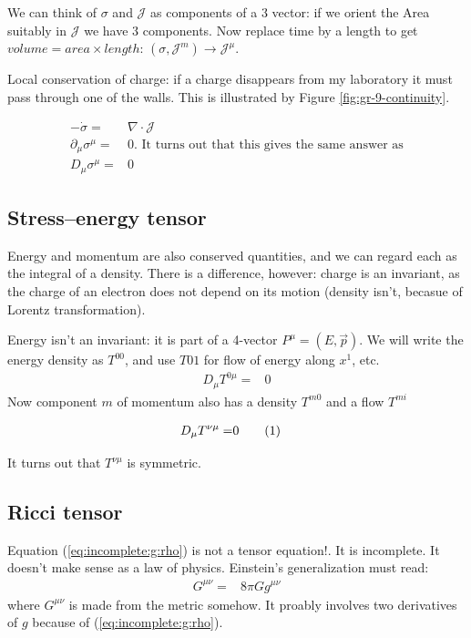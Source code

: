 \documentclass[]{article}
\newcommand\numberthis{\addtocounter{equation}{1}\tag{\theequation}}
\begin{document}
{We can think of $\sigma$ and $\mathscr{J}$ as components of a 3 vector: if we orient the Area suitably in $\mathscr{J}$ we have 3 components. Now replace time by a length to get $volume=area \times length$: $(\sigma,\mathscr{J}^m) \rightarrow 	\mathscr{J}^\mu$.

Local conservation of charge: if a charge disappears from my laboratory it must pass through one of the walls. This is illustrated by Figure \ref{fig:gr-9-continuity}.

\begin{align*}
	- \dot{\sigma} =& \nabla \cdot \mathscr{J}\\
	\partial_\mu \sigma^\mu=&0 \text{. It turns out that this gives the same answer as}\\
	D_\mu \sigma^\mu=&0
\end{align*}


\subsection{Stress–energy tensor} 

Energy and momentum are also conserved quantities, and we can regard each as the integral of a density. There is a difference, however: charge is an invariant, as the charge of an electron does not depend on its motion (density isn't, becasue of Lorentz transformation).

Energy isn't an invariant: it is part of a 4-vector $P^\mu=(E,\vec{p})$. We will write the energy density as $T^{00}$, and use $T{01}$ for flow of energy along $x^1$, etc.
\begin{align*}
	D_\mu T^{0\mu} =& 0
\end{align*}
Now component $m$ of momentum also has a density $T^{m0}$ and a flow $T^{mi}$

\begin{align*}
	D_\mu T^{\nu\mu} =& 0 \numberthis \label{eq:continuity}
\end{align*}

It turns out that $T^{\nu\mu}$ is symmetric.

\subsection{Ricci tensor}

Equation (\ref{eq:incomplete:g:rho}) is not a tensor equation!. It is incomplete. It doesn't make sense as a law of physics. Einstein's generalization must read:
\begin{align*}
	G^{\mu\nu}=& 8 \pi G g^{\mu\nu}
\end{align*}
where $G^{\mu\nu}$ is made from the metric somehow. It proably involves two derivatives of $g$ because of  (\ref{eq:incomplete:g:rho}).

}
\end{document}
